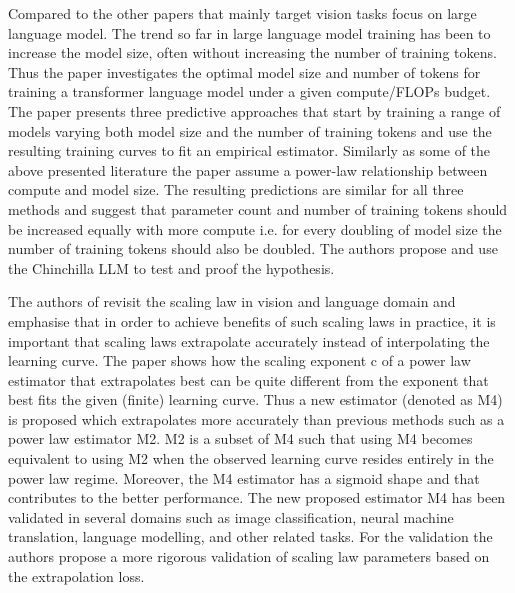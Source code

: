 \documentclass{article} %
\begin{document}
Compared to the other papers that mainly target vision tasks \cite{hoffmann2022training} focus on large language model. The trend so far in large language model training has been to increase the model size, often without increasing the number of training tokens. Thus the paper investigates the optimal model size and number of tokens for training a transformer language model under a given compute/FLOPs budget. The paper presents three predictive approaches that start by training a range of models varying both model size and the number of training tokens and use the resulting training curves to fit an empirical estimator. Similarly as some of the above presented literature the paper assume a power-law relationship between compute and model size. The resulting predictions are similar for all three methods and suggest that parameter count and number of training tokens should be increased equally with more compute i.e. for every doubling of model size the number of training tokens should also be doubled. The authors propose and use the Chinchilla LLM to test and proof the hypothesis.

The authors of \cite{alabdulmohsin2022revisiting} revisit the scaling law in vision and language domain and emphasise that in order to achieve benefits of such scaling laws in practice, it is important that scaling laws extrapolate accurately instead of interpolating the learning curve. The paper shows how the scaling exponent c of a power law estimator that extrapolates best can be quite different from the exponent that best fits the given (finite) learning curve. Thus a new estimator (denoted as M4) is proposed which extrapolates more accurately than previous methods such as a power law estimator M2. M2 is a subset of M4 such that using M4 becomes equivalent to using M2 when the observed learning curve resides entirely in the power law regime. Moreover, the M4 estimator has a sigmoid shape and that contributes to the better performance. The new proposed estimator M4 has been validated in several domains such as image classification, neural machine translation, language modelling, and other related tasks. For the validation the authors propose a more rigorous validation of scaling law parameters based on the extrapolation loss.

\cite{hoffmann2022training}
\cite{alabdulmohsin2022revisiting}
\cite{hutter2021learning}
\cite{mahmood2022data}
\cite{rosenfeld2019constructive}
\cite{sorscher2023neural}
\cite{sun2017revisiting}
\cite{cho2016data}
\end{document}
